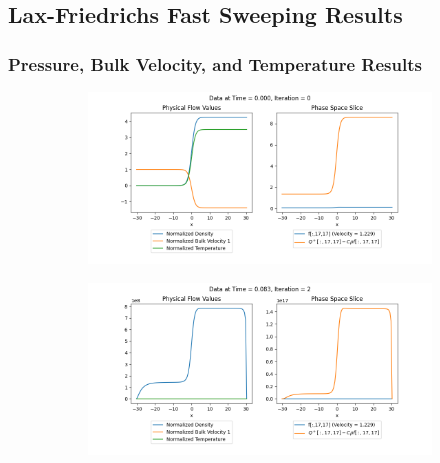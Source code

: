 \documentclass{article}
\begin{document}
\subsection{Lax-Friedrichs Fast Sweeping Results}
\subsubsection{Pressure, Bulk Velocity, and Temperature Results}
\begin{figure}[H]
  \begin{subfigure}[b]{\textwidth}
  \includegraphics[width=\textwidth]{imgs/lf_output2/plots/plot0.png}
  \end{subfigure}
  \hfill
  \begin{subfigure}[b]{\textwidth}
  \includegraphics[width=\textwidth]{imgs/lf_output2/plots/plot2.png}
  \end{subfigure}
\end{figure}
\end{document}
